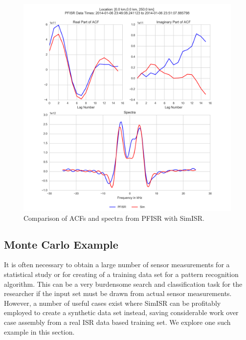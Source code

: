 \begin{figure}[h!]
\centering
\includegraphics[width=4.5in]{speccomp}
\caption{Comparison of ACFs and spectra from PFISR with SimISR.}
\label{fig:simisrspectcom}
\end{figure}
\subsection{Monte Carlo Example}

It is often necessary to obtain a large number of sensor measurements for a statistical study or for creating of a training data set for a pattern recognition algorithm. This can be a very burdensome search and classification task for the researcher if the input set must be drawn from actual sensor measurements. However, a number of useful cases exist where SimISR can be profitably employed to create a synthetic data set instead, saving considerable work over case assembly from a real ISR data based training set.  We explore one such example in this section.

